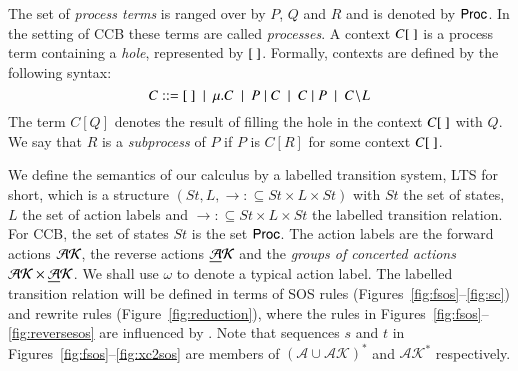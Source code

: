 {%
%

The set of \emph{process terms} is ranged over by $P$, $Q$ and $R$ and is denoted by $\mathsf{Proc}$. 
In the setting of CCB these terms are called \emph{processes}. 
A context $C[\ ]$ is a process term containing a \emph{hole}, represented by $[\ ]$. 
Formally, contexts are defined by the following syntax: 
$$C::= \hole\ \mid\ \mu.C\ \mid\  P\paral C \ \mid\  C \paral P \ \mid \ C\restrict L $$
The term $C[Q]$ denotes the result of filling the hole in the context $C[\ ]$ with $Q$.
We say that $R$ is a \emph{subprocess} of $P$ if $P$ is $C[R]$ for some context $C[\ ]$.

We define the semantics of our calculus by a labelled transition system,
LTS for short, which is a structure $(St,L,\rightarrow: \subseteq St \times L \times St)$
with $St$ the set of states, $L$ the set of action labels and $\rightarrow: 
\subseteq St \times L \times St$ the labelled transition relation.
For CCB, the set of states $St$ is the set $\mathsf{Proc}$. 
The action labels are the forward actions $\mathcal{AK}$, 
the reverse actions $\underline{\mathcal{A}}\mathcal{K}$ and the \emph{groups of concerted actions} $\mathcal{AK} \times \underline{\mathcal{A}}\mathcal{K} $. We shall
use $\omega$ to denote a typical action label.
%
%
The labelled transition relation will be defined in terms of SOS rules (Figures~\ref{fig:fsos}--\ref{fig:sc}) 
and rewrite rules (Figure~\ref{fig:reduction}), where
the rules in Figures~\ref{fig:fsos}--\ref{fig:reversesos}
are influenced by \cite{Irek2007}.  
Note that sequences $s$ and $t$ in Figures~\ref{fig:fsos}--\ref{fig:xc2sos} 
are members of $(\mathcal{A}\cup\mathcal{AK})^*$ and $\mathcal{AK}^*$ respectively.

}
